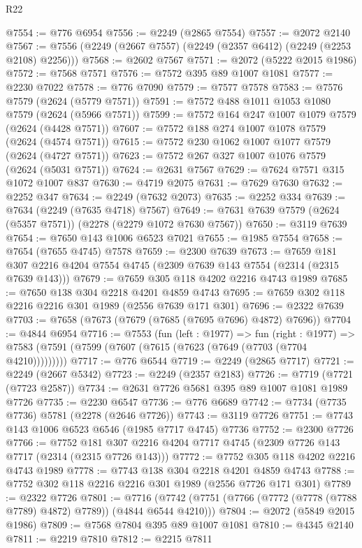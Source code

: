 \begin{lexlean}{R22}
\begin{coremodule}
@7554 := @776 @6954
@7556 := @2249 (@2865 @7554)
@7557 := @2072 @2140
@7567 := @7556 (@2249 (@2667 @7557) (@2249 (@2357 @6412) (@2249 (@2253 @2108) @2256)))
@7568 := @2602 @7567
@7571 := @2072 (@5222 @2015 @1986)
@7572 := @7568 @7571
@7576 := @7572 @395 @89 @1007 @1081
@7577 := @2230 @7022
@7578 := @776 @7090
@7579 := @7577 @7578
@7583 := @7576 @7579 (@2624 (@5779 @7571))
@7591 := @7572 @488 @1011 @1053 @1080 @7579 (@2624 (@5966 @7571))
@7599 := @7572 @164 @247 @1007 @1079 @7579 (@2624 (@4428 @7571))
@7607 := @7572 @188 @274 @1007 @1078 @7579 (@2624 (@4574 @7571))
@7615 := @7572 @230 @1062 @1007 @1077 @7579 (@2624 (@4727 @7571))
@7623 := @7572 @267 @327 @1007 @1076 @7579 (@2624 (@5031 @7571))
@7624 := @2631 @7567
@7629 := @7624 @7571 @315 @1072 @1007 @837
@7630 := @4719 @2075
@7631 := @7629 @7630
@7632 := @2252 @347
@7634 := @2249 (@7632 @2073)
@7635 := @2252 @334
@7639 := @7634 (@2249 (@7635 @4718) @7567)
@7649 := @7631 @7639 @7579 (@2624 (@5357 @7571)) (@2278 (@2279 @1072 @7630 @7567))
@7650 := @3119 @7639
@7654 := @7650 @143 @1006 @6523 @7021
@7655 := @1985 @7554
@7658 := @7654 (@7655 @4745) @7578
@7659 := @2300 @7639
@7673 := @7659 @181 @307 @2216 @4204 @7554 @4745 (@2309 @7639 @143 @7554 (@2314 (@2315 @7639 @143)))
@7679 := @7659 @305 @118 @4202 @2216 @4743 @1989
@7685 := @7650 @138 @304 @2218 @4201 @4859 @4743
@7695 := @7659 @302 @118 @2216 @2216 @301 @1989 (@2556 @7639 @171 @301)
@7696 := @2322 @7639
@7703 := @7658 (@7673 (@7679 (@7685 (@7695 @7696) @4872) @7696))
@7704 := @4844 @6954
@7716 := @7553
    (fun (left : @1977) =>
    fun (right : @1977) =>
    @7583 (@7591 (@7599 (@7607 (@7615 (@7623 (@7649 (@7703 (@7704 @4210)))))))))
@7717 := @776 @6544
@7719 := @2249 (@2865 @7717)
@7721 := @2249 (@2667 @5342)
@7723 := @2249 (@2357 @2183)
@7726 := @7719 (@7721 (@7723 @2587))
@7734 := @2631 @7726 @5681 @395 @89 @1007 @1081 @1989 @7726
@7735 := @2230 @6547
@7736 := @776 @6689
@7742 := @7734 (@7735 @7736) @5781 (@2278 (@2646 @7726))
@7743 := @3119 @7726
@7751 := @7743 @143 @1006 @6523 @6546 (@1985 @7717 @4745) @7736
@7752 := @2300 @7726
@7766 := @7752 @181 @307 @2216 @4204 @7717 @4745 (@2309 @7726 @143 @7717 (@2314 (@2315 @7726 @143)))
@7772 := @7752 @305 @118 @4202 @2216 @4743 @1989
@7778 := @7743 @138 @304 @2218 @4201 @4859 @4743
@7788 := @7752 @302 @118 @2216 @2216 @301 @1989 (@2556 @7726 @171 @301)
@7789 := @2322 @7726
@7801 := @7716 (@7742 (@7751 (@7766 (@7772 (@7778 (@7788 @7789) @4872) @7789)) (@4844 @6544 @4210)))
@7804 := @2072 (@5849 @2015 @1986)
@7809 := @7568 @7804 @395 @89 @1007 @1081
@7810 := @4345 @2140
@7811 := @2219 @7810
@7812 := @2215 @7811

\end{coremodule}
\end{lexlean}
